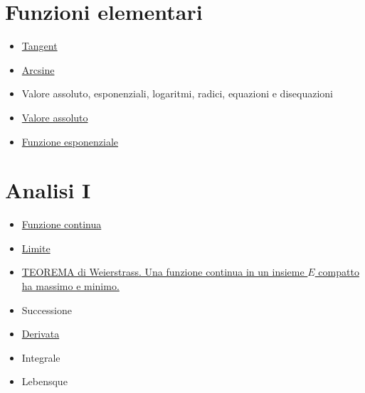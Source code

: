 \section*{Funzioni elementari}
\begin{itemize}
 \item \href{Tangent.pdf}{Tangent}
 \item \href{Arcsine.pdf}{Arcsine}
 \item Valore assoluto, esponenziali, logaritmi, radici, equazioni e disequazioni
 \item \href{./ValoreAssoluto.pdf}{Valore assoluto}
 \item \href{./FunzioneEsponenziale.pdf}{Funzione esponenziale} 
\end{itemize}

\section{Analisi I}
\begin{itemize}
 \item \href{FunzioneContinua.pdf}{Funzione continua}
 \item \href{Limite.pdf}{Limite}
 \item \href{Weierstrass.pdf}{TEOREMA di Weierstrass. Una funzione continua in un insieme $E$ compatto ha massimo e minimo.}
 \item Successione
 \item \href{Derivata.pdf}{Derivata} 
 \item Integrale
 \item Lebensque
\end{itemize}

